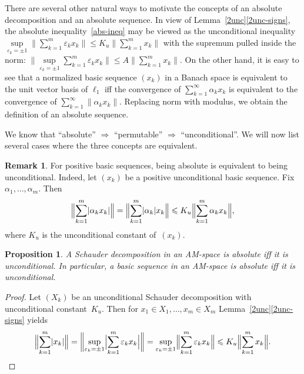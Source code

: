 \documentclass[12pt]{amsart}
\theoremstyle{plain}
\newtheorem{proposition}[theorem]{Proposition}
\theoremstyle{definition}
\newtheorem{remark}[theorem]{Remark}
\newcommand{\abs}[1]{\lvert#1\rvert}
\newcommand{\norm}[1]{\lVert#1\rVert}
\newcommand{\bignorm}[1]{\bigl\lVert#1\bigr\rVert}
\newcommand{\Bigabs}[1]{\Bigl\lvert#1\Bigr\rvert}
\newcommand{\Bignorm}[1]{\Bigl\lVert#1\Bigr\rVert}
\newcommand{\biggnorm}[1]{\biggl\lVert#1\biggr\rVert}
\renewcommand{\le}{\leqslant}
\begin{document}
There are several other natural ways to motivate the concepts of an
absolute decomposition and an absolute sequence. In view of
Lemma~\ref{2unc}\eqref{2unc-signs}, the
absolute inequality~\eqref{abs-ineq} may be viewed as the
unconditional inequality
\begin{math}
  \sup\limits_{\varepsilon_k=\pm 1}
  \bignorm{\sum_{k=1}^m\varepsilon_kx_k}
  \le K_u\bignorm{\sum_{k=1}^mx_k}
\end{math}
with the supremum pulled inside the norm:
\begin{math}
  \bignorm{\sup\limits_{\varepsilon_k=\pm 1}\sum_{k=1}^m\varepsilon_kx_k}
  \le A\bignorm{\sum_{k=1}^mx_k}.
\end{math}
On the other hand, it is easy to see that a normalized basic sequence
$(x_k)$ in a Banach space is equivalent to the unit vector basis of
$\ell_1$ iff the convergence of $\sum_{k=1}^\infty\alpha_kx_k$ is
equivalent to the convergence of
$\sum_{k=1}^\infty\norm{\alpha_kx_k}$. Replacing norm with modulus, we
obtain the definition of an absolute sequence.

We know that ``absolute'' $\Rightarrow$ ``permutable'' $\Rightarrow$
``unconditional''. We will now list several cases where the three
concepts are equivalent.

\begin{remark}
  For positive basic sequences, being absolute is equivalent to being
  unconditional. Indeed, let $(x_k)$ be a positive unconditional basic
  sequence.  Fix $\alpha_1,\dots,\alpha_m$. Then
  \begin{displaymath}
    \Bignorm{\sum_{k=1}^m\abs{\alpha_kx_k}}
        =\Bignorm{\sum_{k=1}^m\abs{\alpha_k}x_k}
        \le K_u\Bignorm{\sum_{k=1}^m \alpha_kx_k},
   \end{displaymath}
   where $K_u$ is the unconditional constant of~$(x_k)$.   
\end{remark}

\begin{proposition}
  A Schauder decomposition in an AM-space is absolute iff it is
  unconditional. In particular, a basic sequence in an AM-space is
  absolute iff it is unconditional.
\end{proposition}

\begin{proof}
  Let $(X_k)$ be an unconditional Schauder
  decomposition with unconditional constant~$K_u$. Then for
  $x_1\in X_1,\dots,x_m\in X_m$ Lemma~\ref{2unc}\eqref{2unc-signs}
  yields
  \begin{displaymath}
    \Bignorm{\sum_{k=1}^m\abs{x_k}}
    =\biggnorm{\sup\limits_{\varepsilon_k=\pm 1}
      \Bigabs{\sum_{k=1}^m\varepsilon_kx_k}}
    =\sup\limits_{\varepsilon_k=\pm 1}
      \Bignorm{\sum_{k=1}^m\varepsilon_kx_k}
    \le K_u\Bignorm{\sum_{k=1}^m x_k}.
  \end{displaymath}

\end{proof}
\end{document}
